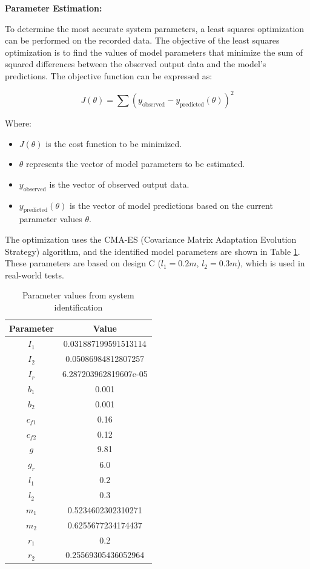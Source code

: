 \textbf{Parameter Estimation:}

To determine the most accurate system parameters, a least squares optimization can be performed on the recorded data. The objective of the least squares optimization is to find the values of model parameters that minimize the sum of squared differences between the observed output data and the model's predictions. The objective function can be expressed as:

\begin{equation}
J(\theta) = \sum (y_{\text{observed}} - y_{\text{predicted}}(\theta))^2
\end{equation}

Where:
\begin{itemize}
\item $J(\theta)$ is the cost function to be minimized.
\item $\theta$ represents the vector of model parameters to be estimated.
\item $y_{\text{observed}}$ is the vector of observed output data.
\item $y_{\text{predicted}}(\theta)$ is the vector of model predictions based on the current parameter values $\theta$.
\end{itemize}

The optimization uses the CMA-ES (Covariance Matrix Adaptation Evolution Strategy) algorithm\cite{hansen2001completely}, and the identified model parameters are shown in Table \ref{tab:parameters}. These parameters are based on design C ($l_1 = 0.2m$, $l_2 = 0.3m$), which is used in real-world tests.

\begin{table}[H]
\centering
\begin{tabular}{|c|c|}
\hline
\textbf{Parameter} & \textbf{Value} \\
\hline
$I_1$ & 0.031887199591513114 \\
$I_2$ & 0.05086984812807257 \\
$I_r$ & 6.287203962819607e-05 \\
$b_1$ & 0.001 \\
$b_2$ & 0.001 \\
$c_{f1}$ & 0.16 \\
$c_{f2}$ & 0.12 \\
$g$ & 9.81 \\
$g_r$ & 6.0 \\
$l_1$ & 0.2 \\
$l_2$ & 0.3 \\
$m_1$ & 0.5234602302310271 \\
$m_2$ & 0.6255677234174437 \\
$r_1$ & 0.2 \\
$r_2$ & 0.25569305436052964 \\
\hline
\end{tabular}
\caption{Parameter values from system identification}
\label{tab:parameters}
\end{table}


